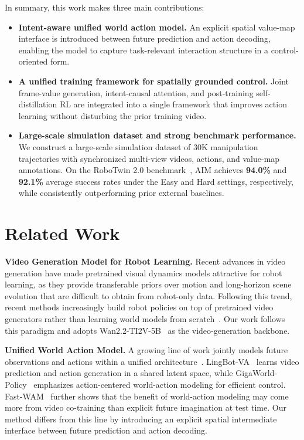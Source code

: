 \documentclass{article}
\begin{document}
In summary, this work makes three main contributions:
\begin{itemize}[leftmargin=*]
    \item \textbf{Intent-aware unified world action model.}
    An explicit spatial value-map interface is introduced between future prediction and action decoding, enabling the model to capture task-relevant interaction structure in a control-oriented form.

    \item \textbf{A unified training framework for spatially grounded control.}
    Joint frame-value generation, intent-causal attention, and post-training self-distillation RL are integrated into a single framework that improves action learning without disturbing the prior training video.

    \item \textbf{Large-scale simulation dataset and strong benchmark performance.}
    We construct a large-scale simulation dataset of 30K manipulation trajectories with synchronized multi-view videos, actions, and value-map annotations. On the RoboTwin 2.0 benchmark~\cite{robotwin2.0}, AIM achieves \textbf{94.0\%} and \textbf{92.1\%} average success rates under the Easy and Hard settings, respectively, while consistently outperforming prior external baselines.
\end{itemize}


\section{Related Work}
\noindent\textbf{Video Generation Model for Robot Learning.}
Recent advances in video generation have made pretrained visual dynamics models attractive for robot learning, as they provide transferable priors over motion and long-horizon scene evolution that are difficult to obtain from robot-only data. Following this trend, recent methods increasingly build robot policies on top of pretrained video generators rather than learning world models from scratch~\cite{hu2024vpp,liang2025videogenerators,dreamzero}. Our work follows this paradigm and adopts Wan2.2-TI2V-5B~\cite{wan2025wan} as the video-generation backbone.

\noindent\textbf{Unified World Action Model.}
A growing line of work jointly models future observations and actions within a unified architecture~\cite{unified_wm,li2026causal,pertsch2025fast,gigaworld,dreamzero}. LingBot-VA~\cite{li2026causal} learns video prediction and action generation in a shared latent space, while GigaWorld-Policy~\cite{gigaworld} emphasizes action-centered world-action modeling for efficient control. Fast-WAM~\cite{pertsch2025fast} further shows that the benefit of world-action modeling may come more from video co-training than explicit future imagination at test time. Our method differs from this line by introducing an explicit spatial intermediate interface between future prediction and action decoding.
\end{document}
